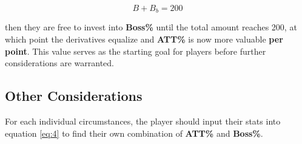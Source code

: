 \documentclass{article}
\begin{document}
\begin{equation}
    B + B_b = 200
\end{equation}

then they are free to invest into \textbf{Boss\%} until the total amount reaches 200, at which point the derivatives equalize and \textbf{ATT\%} is now more valuable \textbf{per point}. This value serves as the starting goal for players before further considerations are warranted.

\subsection{Other Considerations}
For each individual circumstances, the player should input their stats into equation \eqref{eq:4} to find their own combination of \textbf{ATT\%} and \textbf{Boss\%}.
\end{document}
